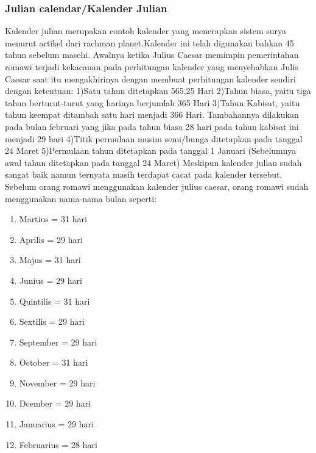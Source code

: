     \subsubsection{Julian calendar/Kalender Julian}
      Kalender julian merupakan contoh kalender yang menerapkan sistem surya menurut artikel dari rachman planet\cite{rachmanplanet}.Kalender ini telah digunakan bahkan 45 tahun sebelum masehi.
    Awalnya ketika Julius Caesar memimpin pemerintahan romawi terjadi kekacauan  pada perhitungan kalender yang menyebabkan Julis Caesar saat itu mengakhirinya dengan membuat perhitungan kalender sendiri dengan ketentuan:
      1)Satu tahun ditetapkan 565,25 Hari
      2)Tahun biasa, yaitu tiga tahun berturut-turut yang harinya berjumlah 365 Hari
      3)Tahun Kabisat, yaitu tahun keempat ditambah satu hari menjadi 366 Hari. Tambahannya dilakukan pada bulan februari yang jika pada tahun biasa 28 hari pada tahun kabisat ini menjadi 29 hari
      4)Titik permulaan musim semi/bunga ditetapkan pada tanggal 24 Maret
      5)Permulaan tahun ditetapkan pada tanggal 1 Januari (Sebelumnya awal tahun ditetapkan pada tanggal 24 Maret)
    Meskipun kalender julian sudah sangat baik namun ternyata masih terdapat cacat pada kalender tersebut.
    Sebelum orang romawi menggunakan kalender julius caesar, orang romawi sudah menggunakan nama-nama bulan seperti:
    \begin{enumerate}
      \item  Martius     = 31 hari
      \item  Aprilis     = 29 hari
      \item  Majus       = 31 hari
      \item  Junius      = 29 hari
      \item  Quintilis   = 31 hari
      \item  Sextilis    = 29 hari
      \item  September   = 29 hari
      \item  October     = 31 hari
      \item  November    = 29 hari
      \item  Dcember     = 29 hari
      \item  Januarius   = 29 hari
      \item  Februarius  = 28 hari
    \end{enumerate} 

